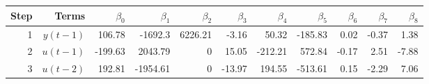 \begin{tabular}{rrrrrrrrrrr}
Step & Terms & $\beta_{0}$ & $\beta_{1}$ & $\beta_{2}$ & $\beta_{3}$ & $\beta_{4}$ & $\beta_{5}$ & $\beta_{6}$ & $\beta_{7}$ & $\beta_{8}$ \\ 
\hline 
1 & $y(t-1)$ & 106.78 & -1692.3 & 6226.21 & -3.16 & 50.32 & -185.83 & 0.02 & -0.37 & 1.38 \\ 
2 & $u(t-1)$ & -199.63 & 2043.79 & 0 & 15.05 & -212.21 & 572.84 & -0.17 & 2.51 & -7.88 \\ 
3 & $u(t-2)$ & 192.81 & -1954.61 & 0 & -13.97 & 194.55 & -513.61 & 0.15 & -2.29 & 7.06 \\ 
\hline 
\end{tabular}
